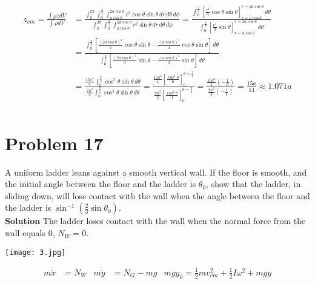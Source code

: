\documentclass[]{article}
\newcommand{\bd}{\textbf}
\begin{document}
	\begin{equation}
		\begin{split}
				z_{cm} = \frac{\int \rho z dV}{\int \rho dV} &= \frac{\int_{0}^{2\pi} \int_{0}^{\frac{\pi}{2}} \int_{a \cos \theta}^{2a \cos \theta} r^3 \cos \theta \sin \theta \, dr \, d\theta \, d\phi}{\int_{0}^{2\pi} \int_{0}^{\frac{\pi}{2}} \int_{a \cos \theta}^{2a \cos \theta} r^2 \sin \theta \, dr \, d\theta \, d\phi} = \frac{\int_{0}^{\frac{\pi}{2}} \left[ \frac{r^4}{4} \cos \theta \sin \theta \right]^{r = 2a \cos \theta}_{r = a \cos \theta} \, d\theta}{\int_{0}^{\frac{\pi}{2}} \left[ \frac{r^3}{3} \sin \theta \right]^{r = 2a \cos \theta}_{r = a \cos \theta} \, d\theta} \\
				&= \frac{\int_{0}^{\frac{\pi}{2}} \left[ \frac{(2a \cos \theta)^4}{4} \cos \theta \sin \theta - \frac{(a \cos \theta)^4}{4} \cos \theta \sin \theta \right] \, d\theta}{\int_{0}^{\frac{\pi}{2}} \left[ \frac{(2a \cos \theta)^3}{3} \sin \theta - \frac{(a \cos \theta)^3}{3} \sin \theta \right] \, d\theta} \\
				&=  \frac{ \frac{15a^4}{4} \int_{0}^{\frac{\pi}{2}} \cos^5 \theta \sin \theta \, d\theta}{ \frac{7a^3}{3}\int_{0}^{\frac{\pi}{2}} \cos^3 \theta \sin \theta \, d\theta} = \frac{ \frac{15a^4}{4} \left[ \frac{\cos^6 \theta}{6} \right]^{\theta = \frac{\pi}{2}}_{0} }{ \frac{7a^3}{3} \left[ \frac{\cos^4 \theta}{4} \right]^{\theta = \frac{\pi}{2}}_{0}} = \frac{ \frac{15a^4}{4} (-\frac{1}{6}) }{ \frac{7a^3}{3} (-\frac{1}{4})} = \frac{15a}{14} \approx 1.071a \\
		\end{split}
	\end{equation}
	
	\section{Problem 17}
	
	A uniform ladder leans against a smooth vertical wall. If the floor is smooth, and the initial angle between the floor and the ladder is $\theta_0$, show that the ladder, in sliding down, will lose contact with the wall when the angle between the floor and the ladder is $\sin^{-1}(\frac{2}{3}\sin \theta_0)$. \\
	
	\bd{Solution} The ladder loses contact with the wall when the normal force from the wall equals $0$, $N_W = 0$. 
	
	\begin{center}
		\texttt{[image: 3.jpg]}
	\end{center}
	\begin{equation}
		\begin{aligned}
			m\ddot{x} &= N_W & m\ddot{y} &= N_G - mg & mgy_0 = \frac{1}{2}mv^2_{cm} + \frac{1}{2} I \omega^2 + mgy \\			
		\end{aligned}
	\end{equation}
\end{document}

